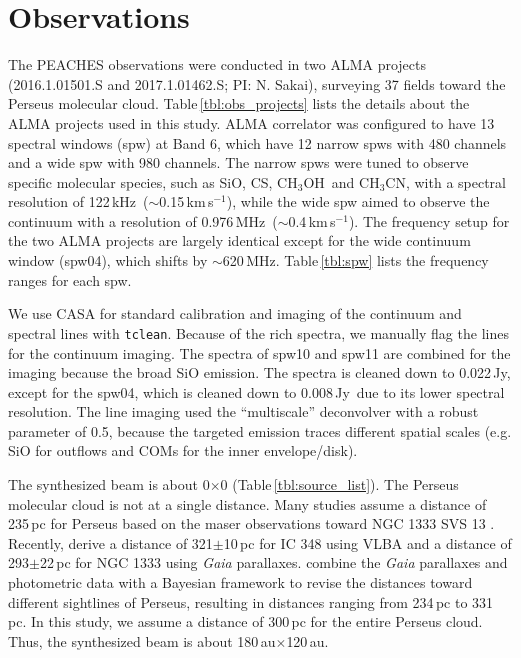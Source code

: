 \documentclass[twocolumn]{aastex62}
\newcommand{\kms}{\mbox{\,km\,s$^{-1}$}}
\newcommand{\mhz}{\mbox{\,MHz}}
\newcommand{\khz}{\mbox{\,kHz}}
\newcommand{\jy}{\mbox{\,Jy}}
\newcommand{\methanol}{\mbox{CH$_{3}$OH}}
\newcommand{\methylcyanide}{\mbox{CH$_{3}$CN}}
\begin{document}
\section{Observations}
\label{sec:observations}
The PEACHES observations were conducted in two ALMA projects (2016.1.01501.S and 2017.1.01462.S; PI: N. Sakai), surveying 37 fields toward the Perseus molecular cloud.  Table\,\ref{tbl:obs_projects} lists the details about the ALMA projects used in this study.  ALMA correlator was configured to have 13 spectral windows (spw) at Band 6, which have 12 narrow spws with 480 channels and a wide spw with 980 channels.  The narrow spws were tuned to observe specific molecular species, such as SiO, CS, \methanol\ and \methylcyanide, with a spectral resolution of 122\khz\ ($\sim$0.15\kms), while the wide spw aimed to observe the continuum with a resolution of 0.976\mhz\ ($\sim$0.4\kms).  The frequency setup for the two ALMA projects are largely identical except for the wide continuum window (spw04), which shifts by $\sim$620\mhz.  Table\,\ref{tbl:spw} lists the frequency ranges for each spw.

We use CASA \citep{2007ASPC..376..127M} for standard calibration and imaging of the continuum and spectral lines with \texttt{tclean}.  Because of the rich spectra, we manually flag the lines for the continuum imaging.  The spectra of spw10 and spw11 are combined for the imaging because the broad SiO emission.  The spectra is cleaned down to 0.022\jy, except for the spw04, which is cleaned down to 0.008\jy\ due to its lower spectral resolution.  The line imaging used the ``multiscale'' deconvolver with a robust parameter of 0.5, because the targeted emission traces different spatial scales (e.g. SiO for outflows and COMs for the inner envelope/disk).

The synthesized beam is about 0$\times$0 (Table\,\ref{tbl:source_list}).  The Perseus molecular cloud is not at a single distance.  Many studies assume a distance of 235\,pc for Perseus based on the maser observations toward NGC 1333 SVS 13 \citep{2008PASJ...60...37H}.  Recently, \citet{2018ApJ...865...73O} derive a distance of 321$\pm$10\,pc for IC 348 using VLBA and a distance of 293$\pm$22\,pc for NGC 1333 using \textit{Gaia} parallaxes.  \citet{2020A&A...633A..51Z} combine the \textit{Gaia} parallaxes and photometric data with a Bayesian framework to revise the distances toward different sightlines of Perseus, resulting in distances ranging from 234\,pc to 331\,pc.  In this study, we assume a distance of 300\,pc for the entire Perseus cloud.  Thus, the synthesized beam is about 180\,au$\times$120\,au.
\end{document}
